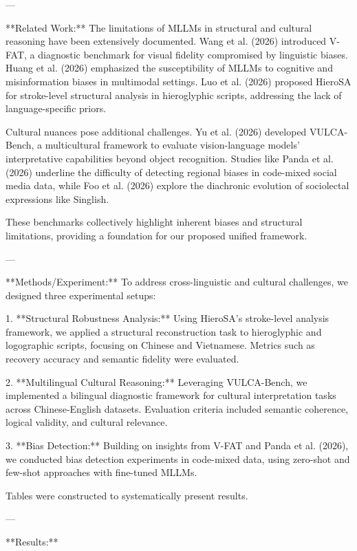 ---

**Related Work:**  
The limitations of MLLMs in structural and cultural reasoning have been extensively documented. Wang et al. (2026) introduced V-FAT, a diagnostic benchmark for visual fidelity compromised by linguistic biases. Huang et al. (2026) emphasized the susceptibility of MLLMs to cognitive and misinformation biases in multimodal settings. Luo et al. (2026) proposed HieroSA for stroke-level structural analysis in hieroglyphic scripts, addressing the lack of language-specific priors.

Cultural nuances pose additional challenges. Yu et al. (2026) developed VULCA-Bench, a multicultural framework to evaluate vision-language models' interpretative capabilities beyond object recognition. Studies like Panda et al. (2026) underline the difficulty of detecting regional biases in code-mixed social media data, while Foo et al. (2026) explore the diachronic evolution of sociolectal expressions like Singlish.

These benchmarks collectively highlight inherent biases and structural limitations, providing a foundation for our proposed unified framework.

---

**Methods/Experiment:**  
To address cross-linguistic and cultural challenges, we designed three experimental setups:

1. **Structural Robustness Analysis:**  
   Using HieroSA's stroke-level analysis framework, we applied a structural reconstruction task to hieroglyphic and logographic scripts, focusing on Chinese and Vietnamese. Metrics such as recovery accuracy and semantic fidelity were evaluated.

2. **Multilingual Cultural Reasoning:**  
   Leveraging VULCA-Bench, we implemented a bilingual diagnostic framework for cultural interpretation tasks across Chinese-English datasets. Evaluation criteria included semantic coherence, logical validity, and cultural relevance.

3. **Bias Detection:**  
   Building on insights from V-FAT and Panda et al. (2026), we conducted bias detection experiments in code-mixed data, using zero-shot and few-shot approaches with fine-tuned MLLMs.

Tables were constructed to systematically present results.

---

**Results:**  

